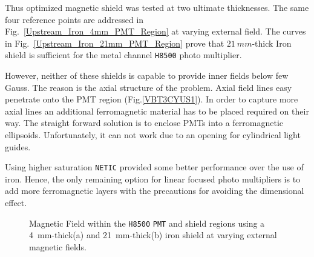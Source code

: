 \documentclass[12pt]{article}
\begin{document}
Thus optimized magnetic shield was tested at two ultimate thicknesses.
The same four reference points are addressed 
in Fig.~\ref{Upstream_Iron_4mm_PMT_Region}  at varying external field. 
The curves in Fig.~\ref{Upstream_Iron_21mm_PMT_Region} 
prove that $21~mm$-thick
Iron shield is sufficient for the metal 
channel {\tt H8500} photo multiplier.

However, neither of these  shields  is capable to provide 
inner fields below few Gauss.
The reason is the axial structure of the problem. 
Axial field lines easy penetrate onto the 
PMT region (Fig.\ref{VBT3CYUS1}). 
In order to capture more axial lines  an  additional 
ferromagnetic material has to be placed  required on their way.
The straight forward solution is to enclose  PMTs into 
a ferromagnetic ellipsoids.
Unfortunately, it can  not work due to an  
opening for cylindrical light guides.

Using higher saturation {\tt NETIC} provided 
some  better  performance over the use of iron.
Hence, the only remaining option for linear 
focused photo multipliers
is to add more  ferromagnetic layers with the 
precautions for  avoiding the  dimensional effect.

\begin{figure}[ht]
\centering
{}
\qquad
{}
\caption{\small{Magnetic Field within the {\tt H8500} {\tt PMT} and shield regions using a 4~mm-thick(a) and 21~mm-thick(b)
 iron shield at varying external magnetic fields.}}\label{Upstream_Iron_4mm}
\end{figure}
\end{document}
